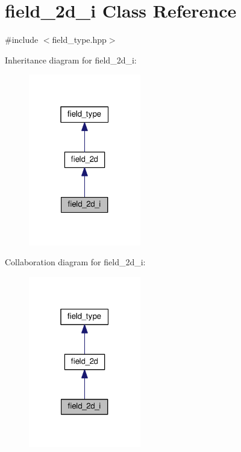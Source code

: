 \hypertarget{classfield__2d__i}{}\section{field\+\_\+2d\+\_\+i Class Reference}
\label{classfield__2d__i}


{\ttfamily \#include $<$field\+\_\+type.\+hpp$>$}



Inheritance diagram for field\+\_\+2d\+\_\+i\+:
\nopagebreak
\begin{figure}[H]
\begin{center}
\leavevmode
\includegraphics[width=139pt]{dd/d3f/classfield__2d__i__inherit__graph}
\end{center}
\end{figure}


Collaboration diagram for field\+\_\+2d\+\_\+i\+:
\nopagebreak
\begin{figure}[H]
\begin{center}
\leavevmode
\includegraphics[width=139pt]{d4/d8c/classfield__2d__i__coll__graph}
\end{center}
\end{figure}
